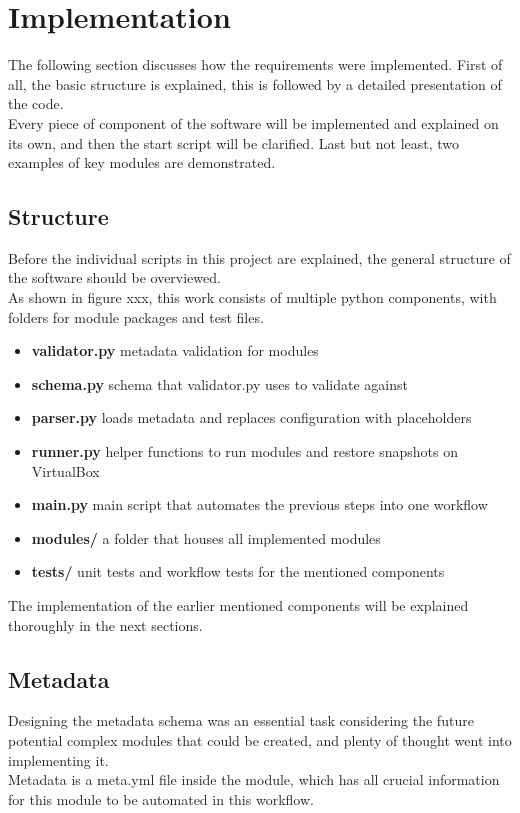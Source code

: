 \chapter{Implementation}
The following section discusses how the requirements were implemented. First of all, the basic structure is explained, this is followed by a detailed presentation of the code.\\
Every piece of component of the software will be implemented and explained on its own, and then the start script will be clarified. Last but not least, two examples of key modules are demonstrated.\\

\section{Structure}
Before the individual scripts in this project are explained, the general structure of the software should be overviewed.\\
As shown in figure xxx, this work consists of multiple python components, with folders for module packages and test files.\\

\begin{itemize}
  \item \textbf{validator.py} metadata validation for modules
  \item \textbf{schema.py} schema that validator.py uses to validate against
  \item \textbf{parser.py} loads metadata and replaces configuration with placeholders
  \item \textbf{runner.py} helper functions to run modules and restore snapshots on VirtualBox
  \item \textbf{main.py} main script that automates the previous steps into one workflow
  \item \textbf{modules/} a folder that houses all implemented modules
  \item \textbf{tests/} unit tests and workflow tests for the mentioned components
\end{itemize}
The implementation of the earlier mentioned components will be explained thoroughly in the next sections.\\

\section{Metadata}
Designing the metadata schema was an essential task considering the future potential complex modules that could be created, and plenty of thought went into implementing it.\\
Metadata is a meta.yml file inside the module, which has all crucial information for this module to be automated in this workflow.\\

